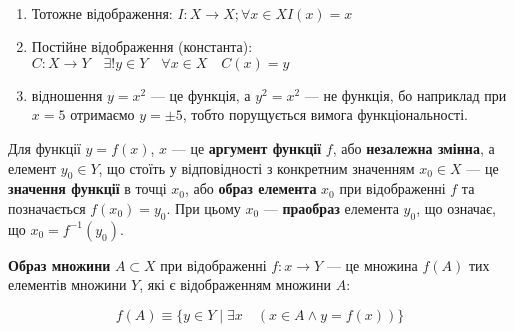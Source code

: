 \begin{example}~

    \begin{enumerate}
        \item Тотожне відображення: $I: X \rightarrow X; \forall x \in X I(x) = x$
        \item Постійне відображення (константа):
            $C: X \rightarrow Y \quad \exists! y \in Y \quad \forall x \in X \quad C(x) = y$
        \item відношення $y = x^2$ --- це функція, а $y^2 = x^2$ --- не функція, бо наприклад
            при $x = 5$ отримаємо $y = \pm 5$, тобто порущується вимога функціональності.
    \end{enumerate}
\end{example}

Для функції $y = f(x)$, $x$ --- це \textbf{аргумент функції} $f$, або \textbf{незалежна
змінна}, а елемент $y_0 \in Y$, що стоїть у відповідності з конкретним значенням
$x_0 \in X$ --- це \textbf{значення функції} в точці $x_0$, або
\textbf{образ елемента} $x_0$ при відображенні $f$ та позначається $f(x_0) = y_0$.
При цьому $x_0$ --- \textbf{праобраз} елемента $y_0$, що означає, що $x_0 = f^{-1}(y_0)$.

\begin{definition}
    \textbf{Образ множини} $A \subset X$ при відображенні $f: x \rightarrow Y$ --- це
    множина $f(A)$ тих елементів множини $Y$, які є відображенням множини $A$:

    $$f(A) \equiv \{y \in Y \mid \exists x \quad (x \in A \wedge y  = f(x))\}$$
\end{definition}

\begin{center}
\end{center}

